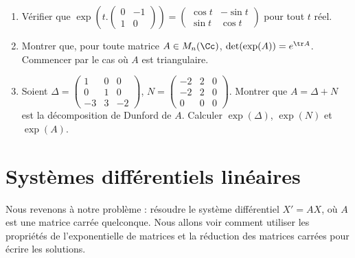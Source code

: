 \documentclass[12pt, class=report,crop=false]{standalone}
\begin{document}
\begin{miniexercices}
\sauteligne
\begin{enumerate}

  \item Vérifier que
$\exp \left(t.
\left(\begin{smallmatrix}
0 & -1\\
 1& 0
\end{smallmatrix}\right)\right) = 
\left(\begin{smallmatrix}
\cos t &- \sin t \\
\sin t & \cos t
\end{smallmatrix}\right)$ pour tout $t$ réel.

  \item Montrer que, pour toute matrice $A \in M_n(\Cc)$, 
$\det(\exp(A)) = e^{\tr A}$. Commencer par le cas où $A$ est triangulaire.


  \item 
  Soient $\Delta = 
    \left(\begin{smallmatrix}
    1 & 0 & 0 \\
0 & 1 & 0 \\
-3 & 3 & -2
      \end{smallmatrix}\right)$,
 $N =
  \left(\begin{smallmatrix} 
-2 & 2 & 0 \\
-2 & 2 & 0 \\
0 & 0 & 0
  \end{smallmatrix}\right)$.     
  Montrer que $A = \Delta + N$ est la décomposition de Dunford de $A$.
  Calculer $\exp(\Delta)$, $\exp(N)$ et $\exp(A)$.
  
  
\end{enumerate}
\end{miniexercices}




\section{Systèmes différentiels linéaires}

Nous revenons à notre problème : résoudre le système différentiel $X'=AX$, 
où $A$ est une matrice carrée quelconque.
Nous allons voir comment utiliser les propriétés 
de l'exponentielle de matrices et la réduction des matrices 
carrées pour écrire les solutions. 

\end{document}
